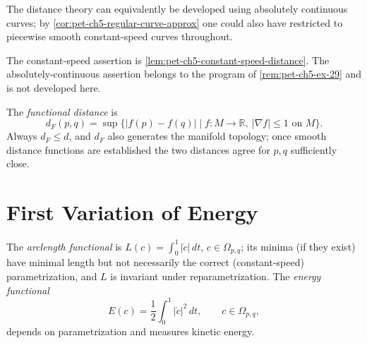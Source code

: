 \begin{remark}
  \label{rem:pet-ch5-absolutely-continuous-curves}
  The distance theory can equivalently be developed using absolutely continuous
  curves; by \cref{cor:pet-ch5-regular-curve-approx} one could also have restricted
  to piecewise smooth constant-speed curves throughout.

  The constant-speed assertion is
  \cref{lem:pet-ch5-constant-speed-distance}. The absolutely-continuous assertion
  belongs to the program of \cref{rem:pet-ch5-ex-29} and is not developed here.
\end{remark}

\begin{definition}
  \label{def:pet-ch5-functional-distance}
  \leanok
  The \emph{functional distance} is
  \[
    d_F(p,q)=\sup\{|f(p)-f(q)|\mid f:M\to\mathbb R,\ |\nabla f|\le1\text{ on }M\}.
  \]
  Always $d_F\le d$, and $d_F$ also generates the manifold topology; once smooth
  distance functions are established the two distances agree for $p,q$ sufficiently
  close.
\end{definition}

\section{First Variation of Energy}

\begin{definition}
  \label{def:pet-ch5-energy-functional}
  \leanok
  The \emph{arclength functional} is $L(c)=\int_0^1|\dot c|\,dt$, $c\in\Omega_{p,q}$;
  its minima (if they exist) have minimal length but not necessarily the correct
  (constant-speed) parametrization, and $L$ is invariant under reparametrization. The
  \emph{energy functional}
  \[
    E(c)=\frac12\int_0^1|\dot c|^2\,dt,\qquad c\in\Omega_{p,q},
  \]
  depends on parametrization and measures kinetic energy.
\end{definition}

